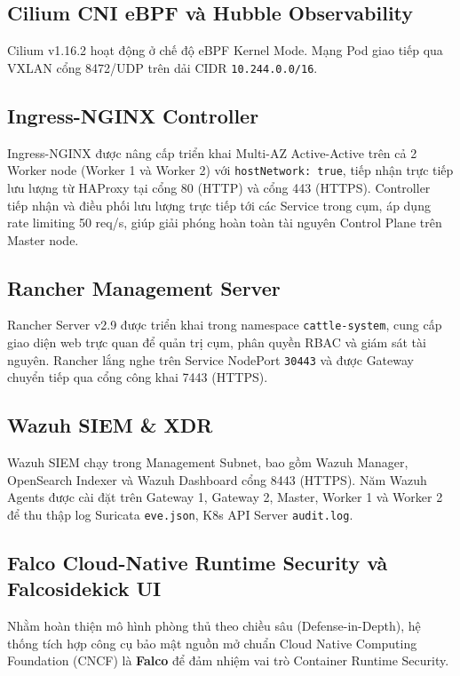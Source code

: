 \subsection{Cilium CNI eBPF và Hubble Observability}
Cilium v1.16.2 hoạt động ở chế độ eBPF Kernel Mode. Mạng Pod giao tiếp qua VXLAN cổng 8472/UDP trên dải CIDR \texttt{10.244.0.0/16}.

\subsection{Ingress-NGINX Controller}
Ingress-NGINX được nâng cấp triển khai Multi-AZ Active-Active trên cả 2 Worker node (Worker 1 và Worker 2) với \texttt{hostNetwork: true}, tiếp nhận trực tiếp lưu lượng từ HAProxy tại cổng 80 (HTTP) và cổng 443 (HTTPS). Controller tiếp nhận và điều phối lưu lượng trực tiếp tới các Service trong cụm, áp dụng rate limiting 50 req/s, giúp giải phóng hoàn toàn tài nguyên Control Plane trên Master node.

\subsection{Rancher Management Server}
Rancher Server v2.9 được triển khai trong namespace \texttt{cattle-system}, cung cấp giao diện web trực quan để quản trị cụm, phân quyền RBAC và giám sát tài nguyên. Rancher lắng nghe trên Service NodePort \texttt{30443} và được Gateway chuyển tiếp qua cổng công khai 7443 (HTTPS).

\subsection{Wazuh SIEM \& XDR}
Wazuh SIEM chạy trong Management Subnet, bao gồm Wazuh Manager, OpenSearch Indexer và Wazuh Dashboard cổng 8443 (HTTPS). Năm Wazuh Agents được cài đặt trên Gateway 1, Gateway 2, Master, Worker 1 và Worker 2 để thu thập log Suricata \texttt{eve.json}, K8s API Server \texttt{audit.log}.

\subsection{Falco Cloud-Native Runtime Security và Falcosidekick UI}
Nhằm hoàn thiện mô hình phòng thủ theo chiều sâu (Defense-in-Depth), hệ thống tích hợp công cụ bảo mật nguồn mở chuẩn Cloud Native Computing Foundation (CNCF) là \textbf{Falco} để đảm nhiệm vai trò Container Runtime Security.

